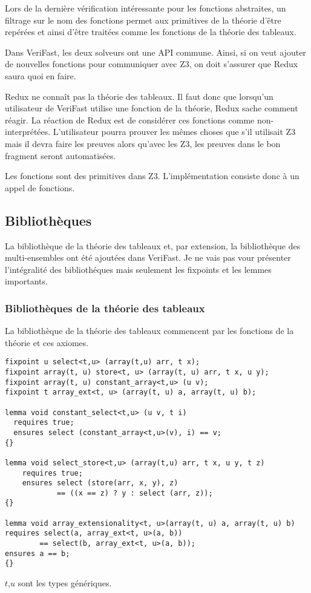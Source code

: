 \documentclass[11pt,openany]{article}
\newcommand{\verifast}{VeriFast}
\begin{document}
		Lors de la derni\`ere v\'erification int\'eressante pour les fonctions abstraites, un filtrage sur le nom des fonctions permet aux primitives de la th\'eorie d'\^etre rep\'er\'ees et ainsi d'\^etre trait\'ees comme les fonctions de la th\'eorie des tableaux.
		
		Dans \verifast{}, les deux solveurs ont une API commune. Ainsi, si on veut ajouter de nouvelles fonctions pour communiquer avec Z3, on doit s'assurer que Redux saura quoi en faire.
		
			Redux ne conna\^it pas la th\'eorie des tableaux. Il faut donc que lorsqu'un utilisateur de \verifast{} utilise une fonction de la th\'eorie, Redux sache comment r\'eagir. La r\'eaction de Redux est de consid\'erer ces fonctions comme non-interpr\'et\'ees. L'utilisateur pourra prouver les m\^emes choses que s'il utilisait Z3 mais il devra faire les preuves alors qu'avec les Z3, les preuves dans le bon fragment seront automatis\'ees.
			
			Les fonctions sont des primitives dans Z3. L'impl\'ementation consiste donc \`a un appel de fonctions.
	
	\subsection{Biblioth\`eques}
		La biblioth\`eque de la th\'eorie des tableaux et, par extension, la biblioth\`eque des multi-ensembles ont \'et\'e ajout\'ees dans \verifast. Je ne vais pas vour pr\'esenter l'int\'egralit\'e des biblioth\'eques mais seulement les fixpoints et les lemmes importants.
		\subsubsection{Biblioth\`eques de la th\'eorie des tableaux}
			La biblioth\`eque de la th\'eorie des tableaux commencent par les fonctions de la th\'eorie et ces axiomes.
			\begin{lstlisting}
fixpoint u select<t,u> (array(t,u) arr, t x);
fixpoint array(t, u) store<t, u> (array(t, u) arr, t x, u y);
fixpoint array(t, u) constant_array<t,u> (u v);
fixpoint t array_ext<t, u> (array(t, u) a, array(t, u) b);

lemma void constant_select<t,u> (u v, t i)
  requires true;
  ensures select (constant_array<t,u>(v), i) == v;
{}

lemma void select_store<t,u> (array(t,u) arr, t x, u y, t z)
    requires true;
    ensures select (store(arr, x, y), z) 
    		== ((x == z) ? y : select (arr, z));
{}

lemma void array_extensionality<t, u>(array(t, u) a, array(t, u) b)
requires select(a, array_ext<t, u>(a, b)) 
		== select(b, array_ext<t, u>(a, b));
ensures a == b;
{}
			\end{lstlisting}
			$t$,$u$ sont les types g\'en\'eriques.
			
\end{document}
